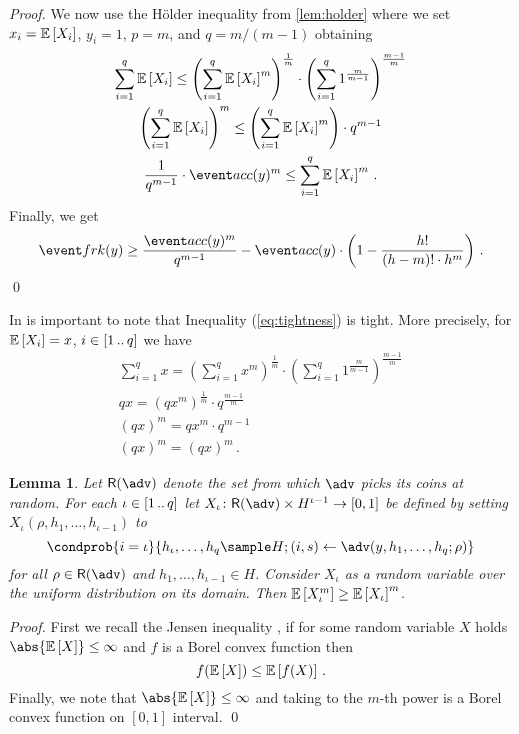 \let\accentvec\vec \documentclass[runningheads,10pt]{llncs}
\newtheorem{lemma}[theorem]{Lemma}
\begin{document}
\begin{proof}
	We now use the H\"older inequality from \cref{lem:holder} where we set  $x_i = \mathbb{E}\left[X_i\right]$, $y_i = 1$, $p = m$, and $q = m/(m - 1)$ obtaining
	\begin{gather}
		\sum_{i = 1}^{q} \expected{X_i}  \leq \left(\sum_{i = 1}^{q} \expected{X_i}^m\right)^{\frac{1}{m}} \cdot \left(\sum_{i = 1}^{q} 1^\frac{m}{m - 1}\right)^{\frac{m - 1}{m}} \label{eq:tightness} \\
		\left(\sum_{i = 1}^{q} \expected{X_i}\right)^{m}  \leq \left(\sum_{i = 1}^{q} \expected{X_i}^m\right) \cdot q^{m - 1}\\
		\frac{1}{q^{m - 1}} \cdot \accProb(y)^{m} \leq \sum_{i = 1}^{q} \expected{X_i}^m\,.
	\end{gather}
	Finally, we get
	\[
		\frkProb(y) \geq \frac{\accProb(y)^m}{q^{m - 1}} - 
		 \accProb(y) \cdot \left(1 - \frac{h!}{(h - m)! \cdot h^m}\right)\,.
	\]
	\qed
\end{proof}

\begin{remark}
	In is important to note that Inequality (\ref{eq:tightness}) is tight. More precisely, for $\mathbb{E}\left[X_i\right] = x$, $i \in [1 \, .. \, q]$ we have
	\begin{gather*}
		\sum_{i = 1}^q x = \left(\sum_{i = 1}^{q} x^m\right)^\frac{1}{m} \cdot \left(\sum_{i = 1}^{q} 1^{\frac{m}{m - 1}}\right)^{\frac{m - 1}{m}} \\
		qx = \left(qx^m\right)^\frac{1}{m} \cdot q^{\frac{m - 1}{m}} \\
		(qx)^m = qx^m \cdot q^{m - 1} \\
		(qx)^m = (qx)^m\,.
	\end{gather*}
\end{remark}

\begin{lemma}\label{lem:jensen}
	Let $\RND{\adv}$ denote the set from which $\adv$ picks its coins at random.
	For each $\iota \in [1 \, .. \, q]$ let $X_\iota \colon \RND{\adv} \times
	H^{\iota - 1} \to [0, 1]$ be defined by setting $X_\iota(\rho, h_1, \ldots,
h_{\iota - 1})$ to 
	\[
		\condprob{i = \iota}{h_\iota, \ldots, h_q \sample H; (i, s) \gets \adv(y, h_1, \ldots, h_q; \rho)} 
	\] 
	for all $\rho \in \RND{\adv}$ and $h_1, \ldots, h_{\iota - 1} \in H$. Consider $X_\iota$ as a random variable over the uniform distribution on its domain. 
	Then $\mathbb{E}\left[X_\iota^m\right] \geq \mathbb{E}\left[X_\iota\right]^m$.
\end{lemma}
\begin{proof}
	First we recall the Jensen inequality \cite{W:Weissten20}, if for some random variable $X$ holds $\abs{\expected{X}} \leq \infty$ and $f$ is a Borel convex function then 
	\[
		f(\mathbb{E}\left[X\right]) \leq \mathbb{E}\left[f(X)\right]\,.
	\] 
	Finally, we note that $\abs{\expected{X}} \leq \infty$ and taking to the $m$-th power is a Borel convex function on $[0, 1]$ interval. 
	\qed
\end{proof}
\end{document}
